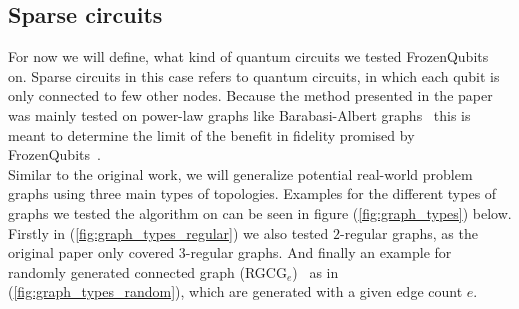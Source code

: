 \subsection{Sparse circuits}
For now we will define, what kind of quantum circuits we tested FrozenQubits~\cite{frozenqubits} on. Sparse circuits in this case refers to quantum circuits, in which each qubit is only connected to few other nodes. Because the method presented in the paper was mainly tested on power-law graphs like Barabasi-Albert graphs~\cite{barabasi} this is meant to determine the limit of the benefit in fidelity promised by FrozenQubits~\cite{frozenqubits}.\\
Similar to the original work, we will generalize potential real-world problem graphs using three main types of topologies. 
Examples for the different types of graphs we tested the algorithm on can be seen in figure (\ref{fig:graph_types}) below. Firstly in (\ref{fig:graph_types_regular}) we also tested $2$-regular graphs, as the original paper only covered $3$-regular graphs. And finally an example for randomly generated connected graph (RGCG$_e$)~\cite{RGCG} as in (\ref{fig:graph_types_random}), which are generated with a given edge count $e$. 
